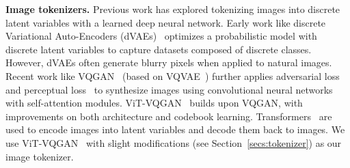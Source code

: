 \textbf{Image tokenizers.} Previous work has explored tokenizing images into discrete latent variables with a learned deep neural network. Early work like discrete Variational Auto-Encoders (dVAEs)~\cite{rolfe2016discrete} optimizes a probabilistic model with discrete latent variables to capture datasets composed of discrete classes. However, dVAEs often generate blurry pixels when applied to natural images. Recent work like VQGAN~\citep{Esser21vqgan} (based on VQVAE~\cite{van2017neural}) further applies adversarial loss~\cite{karras2020analyzing} and perceptual loss~\citep{johnson2016perceptual, zhang2018unreasonable} to synthesize images using convolutional neural networks with self-attention modules. ViT-VQGAN~\cite{yu2021vector} builds upon VQGAN, with improvements on both architecture and codebook learning. Transformers~\cite{vaswani2017attention} are used to encode images into latent variables and decode them back to images. We use ViT-VQGAN~\cite{yu2021vector} with slight modifications (see Section~\ref{secs:tokenizer}) as our image tokenizer.